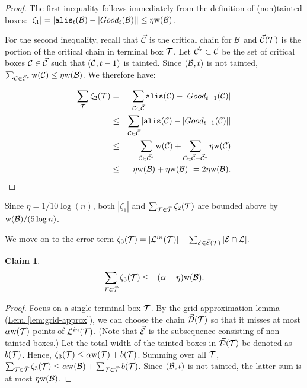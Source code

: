 \documentclass{acmsmall}
\newtheorem{claim}[theorem]{Claim}
\newcommand{\cB}{{\cal B}}
\newcommand{\cC}{{\cal C}}
\newcommand{\cD}{{\cal D}}
\newcommand{\cE}{{\cal E}}
\newcommand{\cL}{{\cal L}}
\newcommand{\cT}{{\cal T}}
\newcommand{\Thm}[1]{\hyperref[thm:#1]{Thm.\,\ref*{thm:#1}}} %
\newcommand{\Lem}[1]{\hyperref[lem:#1]{Lem.\,\ref*{lem:#1}}} %
\newcommand{\alis}{{\tt alis}}
\newcommand{\taint}{\eta}
\newcommand{\width}{{\bf {\rm  w}}}
\newcommand{\gridprec}{\alpha}
\newcommand{\errorterm}{\zeta}
\begin{document}
\begin{proof}
The first inequality follows immediately from the definition of (non)tainted boxes: $|\errorterm_1| = |\alis_t(\cB)-|Good_t(\cB)|| \leq \taint \width(\cB)$.

For the second inequality,
recall that $\vec{\cC}$ is the critical chain for $\cB$ and $\vec{\cC}(\cT)$ is the portion of the critical chain in terminal box $\cT$.
Let $\vec{\cC}^*\subset \vec{\cC}$ be the set of critical boxes $\cC \in \vec{\cC}$ 
such that $(\cC,t-1)$ is tainted.
Since $(\cB,t)$ is not tainted, $\sum_{\cC \in \vec{\cC}^*} \width(\cC) \leq \taint \width(\cB)$.
We therefore have:

\begin{eqnarray*}
\sum_\cT \errorterm_2(\cT) & = & \sum_{\cC \in \vec{\cC}} \alis(\cC)-|Good_{t-1}(\cC)|\\
& \leq & \sum_{\cC \in \vec{\cC}} |\alis(\cC)-|Good_{t-1}(\cC)||\\
& \leq	& \sum_{\cC \in \vec{\cC}^*}\width(\cC) + \sum_{\cC \in \vec{\cC}-\vec{\cC}^*} \taint\width(\cC)\\
& \leq &  \taint\width(\cB) + \taint\width(\cB) \ =  2\taint \width(\cB).
\end{eqnarray*}
\end{proof}
   
Since $\taint=1/10\log(n)$, both 
$|\errorterm_1|$ and  $\sum_{\cT \in \vec{\cT}} \errorterm_2(\cT)$ are  bounded above by $\width(\cB)/(5 \log n)$.


We move on to the error term $\errorterm_3(\cT)= |\cL^{in}(\cT)| - \sum_{\cE \in \vec{\cE}(\cT)} |\cE \cap \cL|.$
%
\begin{claim}
\label{clm:et3} 
\begin{eqnarray*}
\sum_{\cT \in \vec{\cT}} \errorterm_3(\cT)
& \leq & (\gridprec + \taint) \width(\cB).
\end{eqnarray*}
\end{claim}
%
\begin{proof} Focus on a single terminal box $\cT$.
By the grid approximation lemma (\Lem{grid-approx}), we can choose the chain $\vec{\cD}(\cT)$ so that it misses at most
$\gridprec\width(\cT)$ points of $\cL^{in}(\cT)$. (Note that $\vec{\cE}$ is the subsequence consisting of non-tainted boxes.) Let the total width of the tainted boxes in $\vec{\cD}(\cT)$ be denoted as $b(\cT)$.
Hence, $\errorterm_3(\cT) \leq \gridprec\width(\cT) + b(\cT)$. Summing over all $\cT$, $\sum_{\cT \in \vec{\cT}} \errorterm_3(\cT) \leq \gridprec\width(\cB) + \sum_{\cT \in \vec{\cT}} b(\cT)$.
Since $(\cB,t)$ is not tainted, the latter sum is at most $\taint\width(\cB)$. 
\end{proof} 
\end{document}
